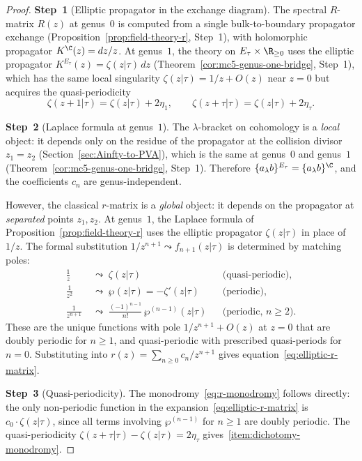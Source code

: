 \begin{proof}
\textbf{Step~1} (Elliptic propagator in the exchange diagram).
The spectral $R$-matrix $R(z)$ at genus~$0$ is computed from
a single bulk-to-boundary propagator exchange
(Proposition~\ref{prop:field-theory-r}, Step~1), with
holomorphic propagator $K^{\C}(z) = dz/z$. At genus~$1$,
the theory on $E_\tau \times \R_{\ge 0}$ uses the elliptic
propagator
$K^{E_\tau}(z) = \zeta(z|\tau)\,dz$
(Theorem~\ref{cor:mc5-genus-one-bridge}, Step~1), which has
the same local singularity
$\zeta(z|\tau) = 1/z + O(z)$ near $z = 0$
but acquires the quasi-periodicity
\[
\zeta(z + 1|\tau) = \zeta(z|\tau) + 2\eta_1,
\qquad
\zeta(z + \tau|\tau) = \zeta(z|\tau) + 2\eta_\tau.
\]

\textbf{Step~2} (Laplace formula at genus~$1$).
The $\lambda$-bracket on cohomology is a \emph{local} object:
it depends only on the residue of the propagator at the
collision divisor $z_1 = z_2$
(Section~\ref{sec:Ainfty-to-PVA}), which is the same at
genus~$0$ and genus~$1$
(Theorem~\ref{cor:mc5-genus-one-bridge}, Step~1). Therefore
$\{a {}_\lambda b\}^{E_\tau} = \{a {}_\lambda b\}^{\C}$,
and the coefficients $c_n$ are genus-independent.

However, the classical $r$-matrix is a \emph{global} object:
it depends on the propagator at \emph{separated} points
$z_1, z_2$. At genus~$1$, the Laplace formula of
Proposition~\ref{prop:field-theory-r} uses the elliptic
propagator $\zeta(z|\tau)$ in place of $1/z$. The formal
substitution $1/z^{n+1} \leadsto f_{n+1}(z|\tau)$ is
determined by matching poles:
\begin{align*}
\frac{1}{z}
 &\;\leadsto\;
 \zeta(z|\tau)
 &&\text{(quasi-periodic)}, \\
\frac{1}{z^2}
 &\;\leadsto\;
 \wp(z|\tau) = -\zeta'(z|\tau)
 &&\text{(periodic)}, \\
\frac{1}{z^{n+1}}
 &\;\leadsto\;
 \frac{(-1)^{n-1}}{n!}\,\wp^{(n-1)}(z|\tau)
 &&\text{(periodic, $n \ge 2$)}.
\end{align*}
These are the unique functions with pole $1/z^{n+1} + O(z)$ at
$z = 0$ that are doubly periodic for $n \ge 1$, and
quasi-periodic with prescribed quasi-periods for $n = 0$.
Substituting into $r(z) = \sum_{n \ge 0} c_n / z^{n+1}$
gives equation~\eqref{eq:elliptic-r-matrix}.

\textbf{Step~3} (Quasi-periodicity).
The monodromy~\eqref{eq:r-monodromy} follows directly:
the only non-periodic function in the
expansion~\eqref{eq:elliptic-r-matrix} is
$c_0 \cdot \zeta(z|\tau)$, since all terms involving
$\wp^{(n-1)}$ for $n \ge 1$ are doubly periodic.
The quasi-periodicity
$\zeta(z + \tau|\tau) - \zeta(z|\tau) = 2\eta_\tau$
gives~\ref{item:dichotomy-monodromy}.


\end{proof}
